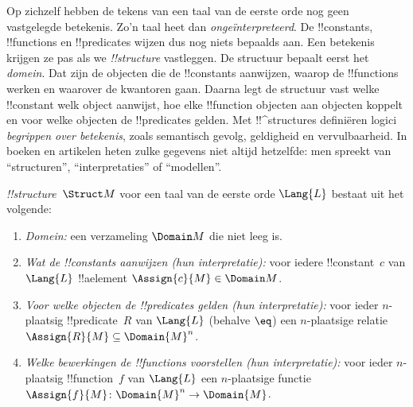 \documentclass[../../../include/open-logic-section]{subfiles}
\begin{document}


\begin{explain}
Op zichzelf hebben de tekens van een taal van de eerste orde nog geen
vastgelegde betekenis. Zo'n taal heet dan \emph{ongeïnterpreteerd}. De
!!{constant}s, !!{function}s en !!{predicate}s wijzen dus nog niets
bepaalds aan. Een betekenis krijgen ze pas als we
 \emph{!!{structure}} vastleggen. De structuur
bepaalt eerst het \emph{domein}. Dat zijn de objecten die de
!!{constant}s aanwijzen, waarop de !!{function}s werken en waarover de
kwantoren gaan. Daarna legt de structuur vast welke !!{constant} welk
object aanwijst, hoe elke !!{function} objecten aan objecten koppelt en
voor welke objecten de !!{predicate}s gelden. Met !!^{structure}s
definiëren logici \emph{begrippen over betekenis}, zoals semantisch gevolg,
geldigheid en vervulbaarheid. In boeken en artikelen heten zulke
gegevens niet altijd hetzelfde: men spreekt van ``structuren'',
``interpretaties'' of ``modellen''.
\end{explain}

\begin{defn}[!!^{structure}s]
 \emph{!!{structure}}~$\Struct M$ voor een taal van
de eerste orde $\Lang{L}$ bestaat uit het volgende:
\begin{enumerate}
\item \emph{Domein:} een verzameling $\Domain M$ die niet leeg is.
\item \emph{Wat de !!{constant}s aanwijzen (hun interpretatie):} voor
  iedere !!{constant}~$c$ van $\Lang{L}$ !!a{element}
  $\Assign{c}{M} \in \Domain M$.
\item \emph{Voor welke objecten de !!{predicate}s gelden (hun
  interpretatie):} voor ieder $n$-plaatsig !!{predicate}~$R$ van
  $\Lang{L}$ (behalve $\eq$) een $n$-plaatsige relatie
  $\Assign{R}{M} \subseteq \Domain{M}^n$.
\item \emph{Welke bewerkingen de !!{function}s voorstellen (hun
  interpretatie):} voor ieder $n$-plaatsig !!{function}~$f$ van
  $\Lang{L}$ een $n$-plaatsige functie
  $\Assign{f}{M} \colon \Domain{M}^n \to \Domain{M}$.
\end{enumerate}
\end{defn}
\end{document}
